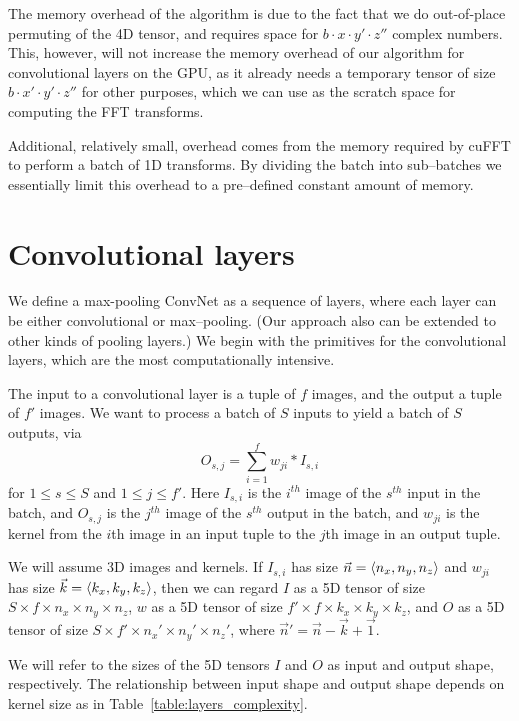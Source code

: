 \documentclass[conference]{./IEEEtran/IEEEtran}
\DeclarePairedDelimiter{\angled}{\langle}{\rangle}
\begin{document}
  The memory overhead of the algorithm is due to the fact that we do
  out-of-place permuting of the 4D tensor, and requires space for $b
  \cdot x \cdot y' \cdot z''$ complex numbers.  This, however, will
  not increase the memory overhead of our algorithm for convolutional
  layers on the GPU, as it already needs a temporary tensor of size $b
  \cdot x' \cdot y' \cdot z''$ for other purposes, which we can use as
  the scratch space for computing the FFT transforms.

  Additional, relatively small, overhead comes from the memory
  required by cuFFT to perform a batch of 1D transforms.  By dividing
  the batch into sub--batches we essentially limit this overhead to a
  pre--defined constant amount of memory.


\section{Convolutional layers}
We define a max-pooling ConvNet as a sequence of layers, where each
layer can be either convolutional or max--pooling. (Our approach
also can be extended to other kinds of pooling layers.)  We begin with the
primitives for the convolutional layers, which are the most
computationally intensive.

  The input to a convolutional layer is a tuple of $f$ images, and the
  output a tuple of $f'$ images.  We want to process a batch of $S$
  inputs to yield a batch of $S$ outputs, via
  \[
  O_{s,j} = \sum_{i=1}^f w_{ji}\ast I_{s,i}
  \]
  for $1 \le s \le S$
  and $1 \le j \le f'$.  Here $I_{s,i}$ is the $i^{th}$ image of the
  $s^{th}$ input in the batch, and $O_{s,j}$ is the $j^{th}$ image of
  the $s^{th}$ output in the batch, and $w_{ji}$ is the kernel from
  the $i$th image in an input tuple to the $j$th image in an output
  tuple.

We will assume 3D images and kernels.  If $I_{s,i}$ has size $\vec{n}
= \angled{n_x, n_y, n_z}$ and $w_{ji}$ has size $\vec{k}
= \angled{k_x,k_y,k_z}$, then we can regard $I$ as a 5D tensor of size
$S \times f \times n_x \times n_y \times n_z$, $w$ as a 5D tensor of size
$f' \times f \times k_x \times k_y \times k_z$, and $O$ as a 5D tensor of
size $S \times f' \times n_x' \times n_y' \times n_z'$, where
$\vec{n}' = \vec{n} - \vec{k} + \vec{1}$.

We will refer to the sizes of the 5D tensors $I$ and $O$ as input and
output shape, respectively.  The relationship between input shape and
output shape depends on kernel size as in
Table~\ref{table:layers_complexity}.
\end{document}
